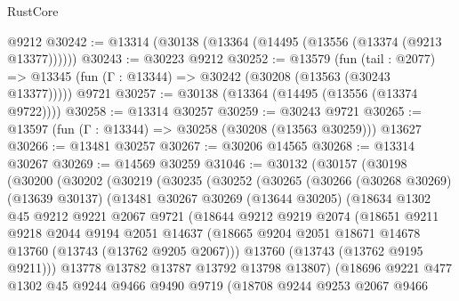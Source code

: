\begin{lexlean}{RustCore}
\begin{coremodule}
    @9212
@30242 := @13314 (@30138 (@13364 (@14495 (@13556 (@13374 (@9213 @13377))))))
@30243 := @30223 @9212
@30252 := @13579
    (fun (tail : @2077) => @13345 (fun (Γ : @13344) => @30242 (@30208 (@13563 (@30243 @13377)))))
    @9721
@30257 := @30138 (@13364 (@14495 (@13556 (@13374 @9722))))
@30258 := @13314 @30257
@30259 := @30243 @9721
@30265 := @13597 (fun (Γ : @13344) => @30258 (@30208 (@13563 @30259))) @13627
@30266 := @13481 @30257
@30267 := @30206 @14565
@30268 := @13314 @30267
@30269 := @14569 @30259
@31046 := @30132
    (@30157
      (@30198
        (@30200
          (@30202
            (@30219
              (@30235
                (@30252
                  (@30265
                    (@30266
                      (@30268 @30269)
                      (@13639 @30137)
                      (@13481
                        @30267
                        @30269
                        (@13644 @30205)
                        (@18634
                          @1302
                          @45
                          @9212
                          @9221
                          @2067
                          @9721
                          (@18644
                            @9212
                            @9219
                            @2074
                            (@18651
                              @9211
                              @9218
                              @2044
                              @9194
                              @2051
                              @14637
                              (@18665
                                @9204
                                @2051
                                @18671
                                @14678
                                @13760
                                (@13743 (@13762 @9205 @2067)))
                              @13760
                              (@13743 (@13762 @9195 @9211)))
                            @13778
                            @13782
                            @13787
                            @13792
                            @13798
                            @13807)
                          (@18696
                            @9221
                            @477
                            @1302
                            @45
                            @9244
                            @9466
                            @9490
                            @9719
                            (@18708
                              @9244
                              @9253
                              @2067
                              @9466

\end{coremodule}
\end{lexlean}
